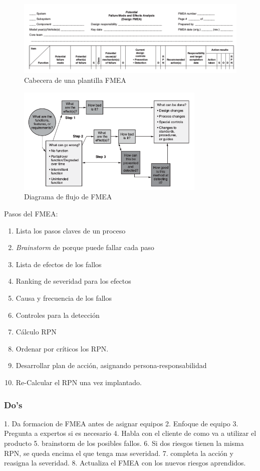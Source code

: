 \documentclass[]{article}
\begin{document}
\begin{figure}[ht!]
	\centering
	\includegraphics[width=170mm]{imagenes/PlantillaFMEA.png}
	\caption{Cabecera de una plantilla FMEA}
	\label{fig:PlantillaFMEA}
\end{figure}

\begin{figure}[ht!]
	\centering
	\includegraphics[width=90mm]{imagenes/FMEAFlowchart.png}
	\caption{Diagrama de flujo de FMEA}
	\label{fig:FMAFlowchart}
\end{figure}

Pasos del FMEA: \begin{enumerate} \item Lista los pasos claves de un proceso \item \textit{Brainstorm} de porque puede fallar cada paso \item Lista de efectos de los fallos \item Ranking de severidad para los efectos \item Causa y frecuencia de los fallos \item Controles para la detección \item Cálculo RPN \item Ordenar por críticos los RPN. \item Desarrollar plan de acción, asignando persona-responsabilidad \item Re-Calcular el RPN una vez implantado. \end{enumerate}

\subsubsection{Do's} 1. Da formacion de FMEA antes de asignar equipos 2. Enfoque de equipo 3. Pregunta a expertos si es necesario 4. Habla con el cliente de como va a utilizar el producto 5. brainstorm de los posibles fallos. 6. Si dos riesgos tienen la misma RPN, se queda encima el que tenga mas severidad. 7. completa la acción y reasigna la severidad. 8. Actualiza el FMEA con los nuevos riesgos aprendidos.
\end{document}

